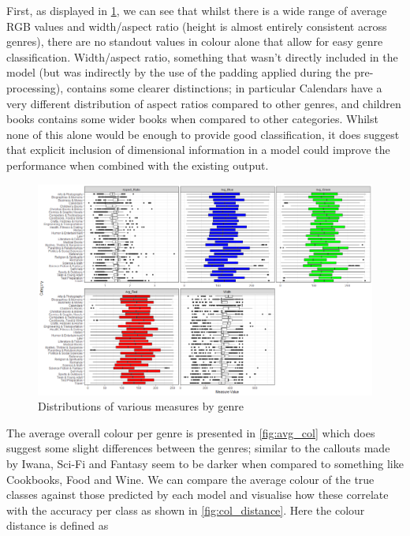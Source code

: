 \documentclass[12pt]{article}
\numberwithin{equation}{section}
\numberwithin{figure}{section}
\begin{document}
First, as displayed in \cref{fig:col_distributions}, we can see that whilst there is a wide range of average RGB values and width/aspect ratio (height is almost entirely consistent across genres), there are no standout values in colour alone that allow for easy genre classification. Width/aspect ratio, something that wasn't directly included in the model (but was indirectly by the use of the padding applied during the pre-processing), contains some clearer distinctions; in particular Calendars have a very different distribution of aspect ratios compared to other genres, and children books contains some wider books when compared to other categories. Whilst none of this alone would be enough to provide good classification, it does suggest that explicit inclusion of dimensional information in a model could improve the performance when combined with the existing output. 

\begin{figure}
	\centering
	\captionsetup{justification=centering}
	\includegraphics[scale=0.45]{distributions_col_ratio.png}
	\caption{Distributions of various measures by genre}
	\label{fig:col_distributions}
\end{figure}

The average overall colour per genre is presented in \cref{fig:avg_col} which does suggest some slight differences between the genres; similar to the callouts made by Iwana, Sci-Fi and Fantasy seem to be darker when compared to something like Cookbooks, Food and Wine. We can compare the average colour of the true classes against those predicted by each model and visualise how these correlate with the accuracy per class as shown in \cref{fig:col_distance}. Here the colour distance is defined as 
\end{document}
